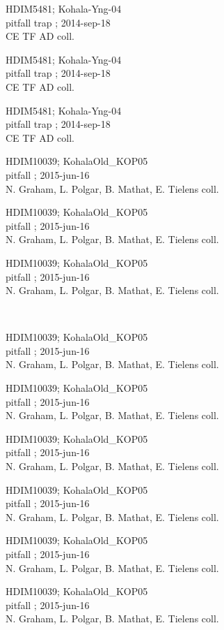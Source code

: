 \documentclass[2pt]{extarticle}
\begin{document}
\noindent
\parbox{0.16\textwidth}{\tiny \raggedright \rule[-0.3\baselineskip]{0pt}{10pt}HDIM5481; Kohala-Yng-04\\ pitfall trap  ; 2014-sep-18\\ CE TF AD coll.}
\parbox{0.16\textwidth}{\tiny \raggedright \rule[-0.3\baselineskip]{0pt}{10pt}HDIM5481; Kohala-Yng-04\\ pitfall trap  ; 2014-sep-18\\ CE TF AD coll.}
\parbox{0.16\textwidth}{\tiny \raggedright \rule[-0.3\baselineskip]{0pt}{10pt}HDIM5481; Kohala-Yng-04\\ pitfall trap  ; 2014-sep-18\\ CE TF AD coll.}
\parbox{0.16\textwidth}{\tiny \raggedright \rule[-0.3\baselineskip]{0pt}{10pt}HDIM10039; KohalaOld\_KOP05\\ pitfall  ; 2015-jun-16\\ N. Graham, L. Polgar, B. Mathat, E. Tielens coll.}
\parbox{0.16\textwidth}{\tiny \raggedright \rule[-0.3\baselineskip]{0pt}{10pt}HDIM10039; KohalaOld\_KOP05\\ pitfall  ; 2015-jun-16\\ N. Graham, L. Polgar, B. Mathat, E. Tielens coll.}
\parbox{0.16\textwidth}{\tiny \raggedright \rule[-0.3\baselineskip]{0pt}{10pt}HDIM10039; KohalaOld\_KOP05\\ pitfall  ; 2015-jun-16\\ N. Graham, L. Polgar, B. Mathat, E. Tielens coll.} \\ 
\vspace{0.001in} 

\noindent
\parbox{0.16\textwidth}{\tiny \raggedright \rule[-0.3\baselineskip]{0pt}{10pt}HDIM10039; KohalaOld\_KOP05\\ pitfall  ; 2015-jun-16\\ N. Graham, L. Polgar, B. Mathat, E. Tielens coll.}
\parbox{0.16\textwidth}{\tiny \raggedright \rule[-0.3\baselineskip]{0pt}{10pt}HDIM10039; KohalaOld\_KOP05\\ pitfall  ; 2015-jun-16\\ N. Graham, L. Polgar, B. Mathat, E. Tielens coll.}
\parbox{0.16\textwidth}{\tiny \raggedright \rule[-0.3\baselineskip]{0pt}{10pt}HDIM10039; KohalaOld\_KOP05\\ pitfall  ; 2015-jun-16\\ N. Graham, L. Polgar, B. Mathat, E. Tielens coll.}
\parbox{0.16\textwidth}{\tiny \raggedright \rule[-0.3\baselineskip]{0pt}{10pt}HDIM10039; KohalaOld\_KOP05\\ pitfall  ; 2015-jun-16\\ N. Graham, L. Polgar, B. Mathat, E. Tielens coll.}
\parbox{0.16\textwidth}{\tiny \raggedright \rule[-0.3\baselineskip]{0pt}{10pt}HDIM10039; KohalaOld\_KOP05\\ pitfall  ; 2015-jun-16\\ N. Graham, L. Polgar, B. Mathat, E. Tielens coll.}
\parbox{0.16\textwidth}{\tiny \raggedright \rule[-0.3\baselineskip]{0pt}{10pt}HDIM10039; KohalaOld\_KOP05\\ pitfall  ; 2015-jun-16\\ N. Graham, L. Polgar, B. Mathat, E. Tielens coll.} \\ 
\vspace{0.001in} 
\end{document}
